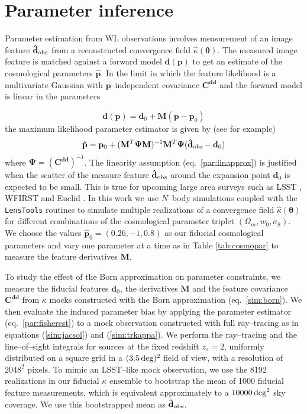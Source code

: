 \documentclass[reprint,aps,prd,superscriptaddress,showkeys,showpacs]{revtex4-1}
\newcommand{\bb}[1]{\mathbf{#1}}
\newcommand{\bbh}[1]{\mathbf{\hat{#1}}}
\newcommand{\h}[1]{\hat{#1}}
\newcommand{\ttt}[1]{\texttt{#1}}
\newcommand\pt{\pmb{\theta}}
\begin{document}

\section{Parameter inference}
\label{sec:params}
% 
Parameter estimation from WL observations involves measurement of an image feature $\bbh{d}_{\rm obs}$ from a reconstructed convergence field $\h{\kappa}(\pt)$. The measured image feature is matched against a forward model $\bb{d}(\bb{p})$ to get an estimate of the cosmological parameters $\bbh{p}$. In the limit in which the feature likelihood is a multivariate Gaussian with $\bb{p}$--independent covariance $\bb{C}^{\bb{d}\bb{d}}$ and the forward model is linear in the parameters 

\begin{equation}
\label{par:linapprox}
\bb{d}(\bb{p}) = \bb{d}_0 + \bb{M}(\bb{p}-\bb{p}_0)
\end{equation}
%
the maximum likelihood parameter estimator is given by (see \citep{DodelsonSchneider13,PetriVariance} for example)
\begin{equation}
\label{par:fisherest}
\bbh{p} = \bb{p}_0 + (\bb{M}^T\bb{\Psi M})^{-1} \bb{M}^T\bb{\Psi} (\bbh{d}_{\rm obs}-\bb{d}_0)
\end{equation}
%
where $\bb{\Psi}=(\bb{C}^{\bb{d}\bb{d}})^{-1}$. The linearity assumption (eq.~\ref{par:linapprox}) is justified when the scatter of the measure feature $\bbh{d}_{\rm obs}$ around the expansion point $\bb{d}_0$ is expected to be small. This is true for upcoming large area surveys such as LSST \citep{LSST}, WFIRST \citep{WFIRST} and Euclid \citep{Euclid}. In this work we use $N$--body simulations coupled with the \ttt{LensTools} routines to simulate multiple realizations of a convergence field $\h{\kappa}(\pt)$ for different combinations of the cosmological parameter triplet $(\Omega_m,w_0,\sigma_8)$. We choose the values $\bbh{p}_0=(0.26,-1,0.8)$ as our fiducial cosmological parameters and vary one parameter at a time as in Table \ref{tab:cosmopar} to measure the feature derivatives $\bb{M}$. 

To study the effect of the Born approximation on parameter constraints, we measure the fiducial features $\bb{d}_0$, the derivatives $\bb{M}$ and the feature covariance $\bb{C}^{\bb{d}\bb{d}}$ from $\kappa$ mocks constructed with the Born approximation (eq.~\ref{sim:born}). We then evaluate the induced parameter bias by applying the parameter estimator (eq.~\ref{par:fisherest}) to a mock observation constructed with full ray--tracing as in equations (\ref{sim:jacsol}) and (\ref{sim:trkappa}). We perform the ray--tracing and the line--of--sight integrals for sources at the  fixed redshift $z_s=2$, uniformly distributed on a square grid in a $(3.5\,{\rm deg})^2$ field of view, with a resolution of $2048^2$ pixels. To mimic an LSST--like mock observation, we use the 8192 realizations in our fiducial $\kappa$ ensemble to bootstrap the mean of 1000 fiducial feature measurements, which is equivalent approximately to a $10000\,{\rm deg}^2$ sky coverage. We use this bootstrapped mean as $\bbh{d}_{\rm obs}$.   
\end{document}
